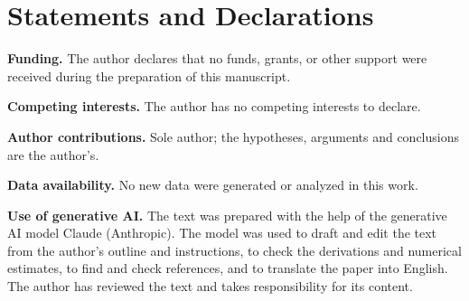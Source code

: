 \documentclass[11pt,a4paper]{article}
\begin{document}
\section*{Statements and Declarations}

\noindent\textbf{Funding.} The author declares that no funds, grants, or other support were received during the preparation of this manuscript.

\noindent\textbf{Competing interests.} The author has no competing interests to declare.

\noindent\textbf{Author contributions.} Sole author; the hypotheses, arguments and conclusions are the author's.

\noindent\textbf{Data availability.} No new data were generated or analyzed in this work.

\noindent\textbf{Use of generative AI.} The text was prepared with the help of the generative AI model Claude (Anthropic). The model was used to draft and edit the text from the author's outline and instructions, to check the derivations and numerical estimates, to find and check references, and to translate the paper into English. The author has reviewed the text and takes responsibility for its content.



\end{document}
